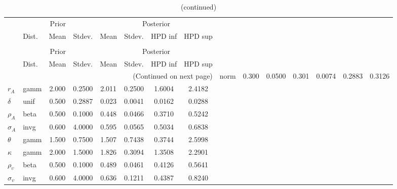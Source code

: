  
\begin{center}
\begin{longtable}{llcccccc} 
\caption{Results from Metropolis-Hastings (parameters)}
 \label{Table:MHPosterior:1}\\
\toprule 
  & \multicolumn{3}{c}{Prior}  &  \multicolumn{4}{c}{Posterior} \\
  \cmidrule(r{.75em}){2-4} \cmidrule(r{.75em}){5-8}
  & Dist. & Mean  & Stdev. & Mean & Stdev. & HPD inf & HPD sup\\
\midrule \endfirsthead 
\caption{(continued)}\\\toprule 
  & \multicolumn{3}{c}{Prior}  &  \multicolumn{4}{c}{Posterior} \\
  \cmidrule(r{.75em}){2-4} \cmidrule(r{.75em}){5-8}
  & Dist. & Mean  & Stdev. & Mean & Stdev. & HPD inf & HPD sup\\
\midrule \endhead 
\bottomrule \multicolumn{8}{r}{(Continued on next page)} \endfoot 
\bottomrule \endlastfoot 
${\alpha}$ & norm &   0.300 & 0.0500 &   0.301& 0.0074 &  0.2883 &  0.3126 \\ 
${r_{A}}$ & gamm &   2.000 & 0.2500 &   2.011& 0.2500 &  1.6004 &  2.4182 \\ 
${\delta}$ & unif &   0.500 & 0.2887 &   0.023& 0.0041 &  0.0162 &  0.0288 \\ 
${\rho_A}$ & beta &   0.500 & 0.1000 &   0.448& 0.0466 &  0.3710 &  0.5242 \\ 
${\sigma_A}$ & invg &   0.600 & 4.0000 &   0.595& 0.0565 &  0.5034 &  0.6838 \\ 
${\theta}$ & gamm &   1.500 & 0.7500 &   1.507& 0.7438 &  0.3744 &  2.5998 \\ 
${\kappa}$ & gamm &   2.000 & 1.5000 &   1.826& 0.3094 &  1.3508 &  2.2901 \\ 
${\rho_\upsilon}$ & beta &   0.500 & 0.1000 &   0.489& 0.0461 &  0.4126 &  0.5641 \\ 
${\sigma_\upsilon}$ & invg &   0.600 & 4.0000 &   0.636& 0.1211 &  0.4387 &  0.8240 \\ 
\end{longtable}
 \end{center}
